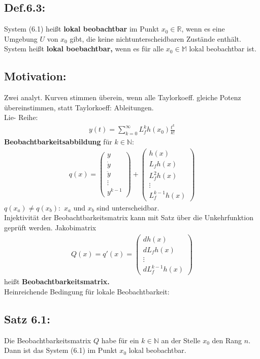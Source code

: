 \documentclass[ngerman]{tudscrreprt}
\begin{document}
\subsection*{Def.6.3:}System (6.1) heißt \textbf{lokal beobachtbar} im Punkt $x_0 \in \mathbb{R}$, wenn es eine Umgebung $U$ von $x_0$ gibt, die keine nichtunterscheidbaren Zustände enthält. System heißt \textbf{lokal boebachtbar,} wenn es für alle $x_0\in \mathbb{M}$ lokal beobachtbar ist. 
\subsection*{Motivation:} Zwei analyt. Kurven stimmen überein, wenn alle Taylorkoeff. gleiche Potenz übereinstimmen, statt Taylorkoeff: Ableitungen.\\ 
Lie- Reihe: \begin{align*}
y(t) = \sum\limits_{k=0}^{\infty} L_f^k h(x_0)\frac{t^k}{k!}
\end{align*}
\textbf{Beobachtbarkeitsabbildung} für $k \in \mathbb{N}:$ \begin{align*}
q(x) = \begin{pmatrix} y\\ \dot y\\ \ddot y\\ \vdots\\ y^{k-1}\end{pmatrix} + \begin{pmatrix} h(x)\\ L_fh(x)\\ L_f^2h(x)\\ \vdots\\ L_f^{k-1}h(x)\end{pmatrix} 
\end{align*}
$q(x_a) \ne q(x_b):$ $x_a$ und $x_b$ sind unterscheidbar.\\ 
Injektivität der Beobachtbarkeitsmatrix kann mit Satz über die Unkehrfunktion geprüft werden. Jakobimatrix \begin{align*}
Q(x) = q'(x) = \begin{pmatrix} dh(x)\\ dL_fh(x)\\ \vdots\\ dL_f^{k-1}h(x)\end{pmatrix}
\end{align*}heißt \textbf{Beobachtbarkeitsmatrix.}\\ 
Heinreichende Bedingung für lokale Beobachtbarkeit: 
\subsection*{Satz 6.1:} Die Beobachtbarkeitsmatrix $Q$ habe für ein $k \in \mathbb{N}$ an der Stelle $x_0$ den Rang $n$. Dann ist das System (6.1) im Punkt $x_0$ lokal beobachtbar.
\end{document}
